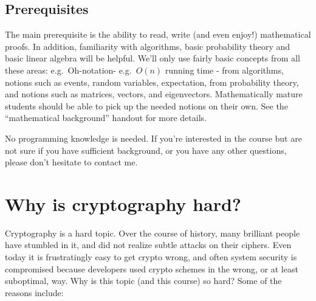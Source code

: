 \subsection{Prerequisites}\label{p-Prerequisites}

The main prerequisite is the ability to read, write (and even enjoy!)
mathematical proofs. In addition, familiarity with algorithms, basic
probability theory and basic linear algebra will be helpful. We'll only
use fairly basic concepts from all these areas: e.g.~Oh-notation-
e.g.~\(O(n)\) running time - from algorithms, notions such as events,
random variables, expectation, from probability theory, and notions such
as matrices, vectors, and eigenvectors. Mathematically mature students
should be able to pick up the needed notions on their own. See the
``mathematical background'' handout for more details.

No programming knowledge is needed. If you're interested in the course
but are not sure if you have sufficient background, or you have any
other questions, please don't hesitate to contact me.

\section{Why is cryptography hard?}\label{p-Why-is-cryptography-ha}

Cryptography is a hard topic. Over the course of history, many brilliant
people have stumbled in it, and did not realize subtle attacks on their
ciphers. Even today it is frustratingly easy to get crypto wrong, and
often system security is compromised because developers used crypto
schemes in the wrong, or at least suboptimal, way. Why is this topic
(and this course) so hard? Some of the reasons include:

